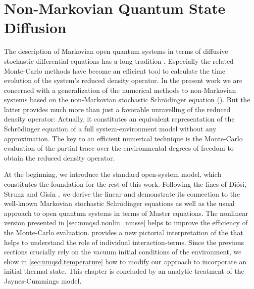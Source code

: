 \chapter{Non-Markovian Quantum State Diffusion}
\label{chap:nmqsd}
%

The description of Markovian open quantum systems in terms of diffusive stochastic differential equations has a long tradition \cite{Ca93_quantum_optics,Pe98_qsd,GaZo04_quantum_noise}.
Especially the related Monte-Carlo methods have become an efficient tool to calculate the time evolution of the system's reduced density operator.
In the present work we are concerned with a generalization of the numerical methods to non-Markovian systems based on the non-Markovian stochastic Schrödinger equation (\NMSSE).
But the latter provides much more than just a favorable unravelling of the reduced density operator:
Actually, it constitutes an equivalent representation of the Schrödinger equation of a full system-environment model without any approximation.
The key to an efficient numerical technique is the Monte-Carlo evaluation of the partial trace over the environmental degrees of freedom to obtain the reduced density operator.

At the beginning, we introduce the standard open-system model, which constitutes the foundation for the rest of this work.
Following the lines of Diósi, Strunz and Gisin \cite{DiSt97_nmsse,DiGiSt98_nmqsd,StDiGi99_nmq_traj}, we derive the linear \NMSSE and demonstrate its connection to the well-known Markovian stochastic Schrödinger equations as well as the usual approach to open quantum systems in terms of Master equations.
The nonlinear version presented in \autoref{sec:nmqsd.nonlin_nmsse} helps to improve the efficiency of the Monte-Carlo evaluation.
 provides a new pictorial interpretation of the \NMSSE that helps to understand the role of individual interaction-terms.
Since the previous sections crucially rely on the vacuum initial conditions of the environment, we show in \autoref{sec:nmqsd.temperature} how to modify our approach to incorporate an initial thermal state.
This chapter is concluded by an analytic treatment of the Jaynes-Cummings model.

